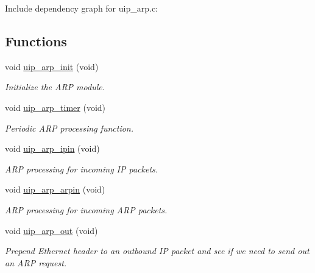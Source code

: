 Include dependency graph for uip\_\-arp.c:\subsection*{Functions}
\begin{CompactItemize}
\item 
\hypertarget{a00067_g2d9d28afa353f662b9bb5234fc419f72}{
void \hyperlink{a00067_g2d9d28afa353f662b9bb5234fc419f72}{uip\_\-arp\_\-init} (void)}
\label{a00067_g2d9d28afa353f662b9bb5234fc419f72}

\begin{CompactList}\small\item\em Initialize the ARP module. \item\end{CompactList}\item 
void \hyperlink{a00067_g058a8e6025f67b021862281f1911fcef}{uip\_\-arp\_\-timer} (void)
\begin{CompactList}\small\item\em Periodic ARP processing function. \item\end{CompactList}\item 
void \hyperlink{a00067_g5cf8d6974a89ad67c5faf9b19261cb7c}{uip\_\-arp\_\-ipin} (void)
\begin{CompactList}\small\item\em ARP processing for incoming IP packets. \item\end{CompactList}\item 
void \hyperlink{a00067_g902c4a360134096224bc2655f623aa5f}{uip\_\-arp\_\-arpin} (void)
\begin{CompactList}\small\item\em ARP processing for incoming ARP packets. \item\end{CompactList}\item 
void \hyperlink{a00067_g54b27e45df15e10a0eb1a3e3a91417d2}{uip\_\-arp\_\-out} (void)
\begin{CompactList}\small\item\em Prepend Ethernet header to an outbound IP packet and see if we need to send out an ARP request. \item\end{CompactList}\end{CompactItemize}
